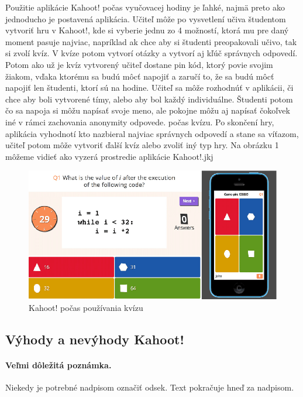 \documentclass[10pt,oneside,slovak,a4paper]{article}
\begin{document}
Použitie aplikácie Kahoot! počas vyučovacej hodiny je ľahké, najmä preto ako jednoducho je postavená aplikácia. Učiteľ môže po vysvetlení učiva študentom vytvoriť hru v Kahoot!, kde si vyberie jednu zo 4 možností, ktorá mu pre daný moment pasuje najviac, napríklad ak chce aby si študenti preopakovali učivo, tak si zvolí kvíz. V kvíze potom vytvorí otázky a vytvorí aj kľúč správnych odpovedí. Potom ako už je kvíz vytvorený učiteľ dostane pin kód, ktorý povie svojim žiakom, vďaka ktorému sa budú môcť napojiť a zaručí to, že sa budú môcť napojiť len študenti, ktorí sú na hodine. Učiteľ sa môže rozhodnúť v aplikácii, či chce aby boli vytvorené tímy, alebo aby bol každý individuálne. Študenti potom čo sa napoja si môžu napísať svoje meno, ale pokojne môžu aj napísať čokoľvek iné v rámci zachovania anonymity odpovede.  počas kvízu. Po skončení hry, aplikácia vyhodnotí kto nazbieral najviac správnych odpovedí a stane sa víťazom, učiteľ potom môže vytvoriť ďalší kvíz alebo zvoliť iný typ hry. Na obrázku 1 môžeme vidieť ako vyzerá prostredie aplikácie Kahoot!.jkj
\begin{figure} %
\centering
\includegraphics[width=\textwidth]{Kahoot.png}
\caption{Kahoot! počas používania kvízu}
\label{duo-uzivatelia}
\end{figure}


\subsection{Výhody a nevýhody Kahoot!} \label{ina:este}

\paragraph{Veľmi dôležitá poznámka.}
Niekedy je potrebné nadpisom označiť odsek. Text pokračuje hneď za nadpisom.
\end{document}
